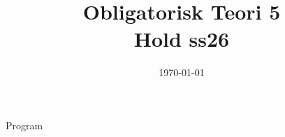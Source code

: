 \documentclass[11pt,aspectratio=169]{beamer}
\title{Obligatorisk Teori 5 \\
Hold ss26}
\date{\today}
\begin{document}
\begin{frame}
  \titlepage
\end{frame}

\begin{frame}{Program}
  \tableofcontents
\end{frame}














\end{document}
